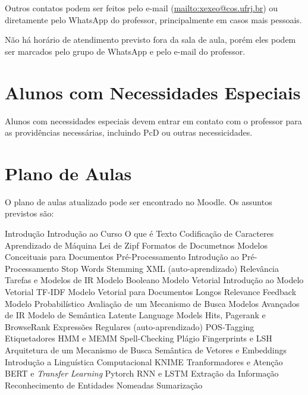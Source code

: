 \documentclass{article}
\begin{document}
Outros contatos podem ser feitos pelo e-mail (\url{mailto:xexeo@cos.ufrj.br}) ou diretamente pelo WhatsApp do professor, principalmente em casos mais pessoais.

Não há horário de atendimento previsto fora da sala de aula, porém eles podem ser marcados pelo grupo de WhatsApp e pelo e-mail do professor.

\section{Alunos com Necessidades Especiais}

Alunos com necessidades especiais devem entrar em contato com o professor para as providências necessárias, incluindo PcD ou outras necessicidades. 

\section{Plano de Aulas}

O plano de aulas atualizado pode ser encontrado no Moodle. Os assuntos previstos são:

\begin{outline}
    \1 Introdução
    \2 Introdução ao Curso
    \2 O que é Texto
    \2 Codificação de Caracteres
    \2 Aprendizado de Máquina
    \2 Lei de Zipf
    \2 Formatos de Documetnos
    \2 Modelos Conceituais para Documentos
    \1 Pré-Processamento
    \2 Introdução ao Pré-Processamento
    \2 Stop Words
    \2 Stemming
    \1 XML (auto-aprendizado)
    \1 Relevância
    \1 Tarefas e Modelos de IR
    \1 Modelo Booleano
    \1 Modelo Vetorial
    \2 Introdução ao Modelo Vetorial
    \2 TF-IDF
    \2 Modelo Vetorial para Documentos Longos
    \2 Relevance Feedback
    \1 Modelo Probabilístico
    \1 Avaliação de um Mecanismo de Busca
    \1 Modelos Avançados de IR
    \2 Modelo de Semântica Latente
    \2 Language Models
    \1 Hits, Pagerank e BrowseRank
    \1 Expressões Regulares (auto-aprendizado)
    \1 POS-Tagging
    \2 Etiquetadores
    \2 HMM e MEMM    
    \1 Spell-Checking
    \1 Plágio
    \1 Fingerprints e LSH
    \1 Arquitetura de um Mecanismo de Busca
    \1 Semântica de Vetores e Embeddings
    \1 Introdução a Linguística Computacional
    \1 KNIME
    \1 Tranformadores e Atenção
    \1 BERT e \textit{Transfer Learning}
    \1 Pytorch
    \1 RNN e LSTM
    \1 Extração da Informação
    \1 Reconhecimento de Entidades Nomeadas
    \1 Sumarização
\end{outline}


\nocite{*}
\printbibliography
\end{document}
